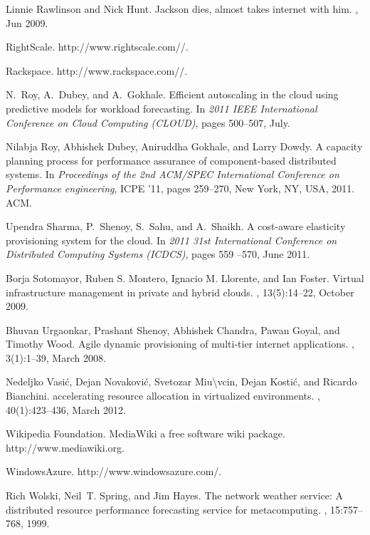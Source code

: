 \documentclass{sig-alternate-10pt}
\begin{document}
\begin{thebibliography}{10}
Linnie Rawlinson and Nick Hunt.
\newblock Jackson dies, almost takes internet with him.
, Jun 2009.

{RightScale. http://www.rightscale.com//}.

{Rackspace. http://www.rackspace.com//}.

N.~Roy, A.~Dubey, and A.~Gokhale.
\newblock Efficient autoscaling in the cloud using predictive models for
  workload forecasting.
\newblock In {\em 2011 {IEEE} International Conference on Cloud Computing
  ({CLOUD)}}, pages 500--507, July.

Nilabja Roy, Abhishek Dubey, Aniruddha Gokhale, and Larry Dowdy.
\newblock A capacity planning process for performance assurance of
  component-based distributed systems.
\newblock In {\em Proceedings of the 2nd ACM/SPEC International Conference on
  Performance engineering}, ICPE '11, pages 259--270, New York, NY, USA, 2011.
  ACM.

Upendra Sharma, P.~Shenoy, S.~Sahu, and A.~Shaikh.
\newblock A cost-aware elasticity provisioning system for the cloud.
\newblock In {\em 2011 31st International Conference on Distributed Computing
  Systems ({ICDCS)}}, pages 559 --570, June 2011.

Borja Sotomayor, Ruben {S.} Montero, Ignacio {M.} Llorente, and Ian Foster.
\newblock Virtual infrastructure management in private and hybrid clouds.
, 13(5):14--22, October 2009.

Bhuvan Urgaonkar, Prashant Shenoy, Abhishek Chandra, Pawan Goyal, and Timothy
  Wood.
\newblock Agile dynamic provisioning of multi-tier internet applications.
, 3(1):1--39, March 2008.

Nedeljko Vasić, Dejan Novaković, Svetozar Miu{\textbackslash}vcin, Dejan
  Kostić, and Ricardo Bianchini.
 accelerating resource allocation in virtualized
  environments.
, 40(1):423--436, March 2012.

{Wikipedia Foundation}.
\newblock MediaWiki a free software wiki package. {http://www.mediawiki.org}.

{WindowsAzure. http://www.windowsazure.com/}.

Rich Wolski, Neil~T. Spring, and Jim Hayes.
\newblock The network weather service: A distributed resource performance
  forecasting service for metacomputing.
, 15:757--768,
  1999.

\end{thebibliography}
\end{document}

